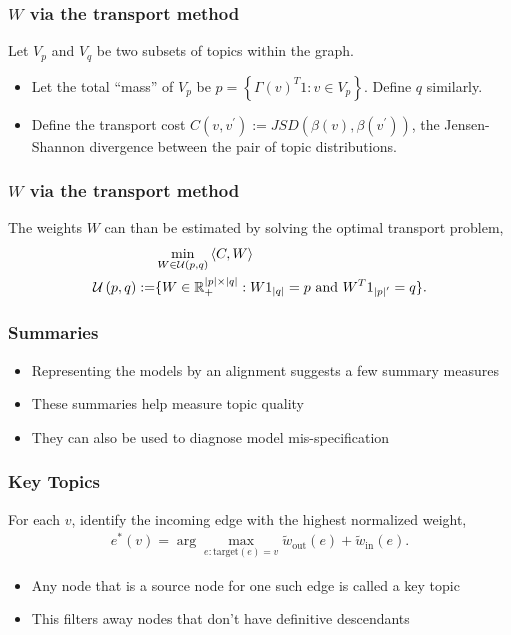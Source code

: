 \documentclass{beamer}
\begin{document}
\begin{frame}
  \frametitle{$W$ via the transport method}
  Let $V_p$ and $V_q$ be two subsets of topics within the graph.
  \begin{itemize}
    \item Let the total ``mass'' of $V_p$ be $p =
    \left\{\Gamma\left(v\right)^T 1 : v \in V_{p}\right\}$. Define $q$ similarly.
    \item Define the transport cost $C\left(v, v^\prime\right) :=
    JSD\left(\beta\left(v\right), \beta\left(v^\prime\right)\right)$, the
    Jensen-Shannon divergence between the pair of topic distributions.
  \end{itemize}
\end{frame}

\begin{frame}
\frametitle{$W$ via the transport method}
The weights $W$ can than be estimated by solving the optimal transport problem,
\begin{align*}
&\min_{W \in \mathcal{U}\left(p, q\right)} \left<C,W\right> \\
\mathcal{U}\left(p, q\right) := &\{W\in \mathbb{R}^{\left|p\right| \times \left|q\right|}_{+} : W 1_{\left|q\right|} = p \text{ and } W^{T} 1_{\left|p\right|^\prime} = q\}.
\end{align*}
\end{frame}

\begin{frame}
  \frametitle{Summaries}
  \begin{itemize}
    \item Representing the models by an alignment suggests a few summary measures
    \item These summaries help measure topic quality
    \item They can also be used to diagnose model mis-specification
  \end{itemize}
\end{frame}

\begin{frame}
  \frametitle{Key Topics}
  For each $v$, identify the incoming edge with the highest normalized weight,
  \begin{align*}
    e^\ast\left(v\right) = \arg \max_{e : \text{target}\left(e\right) = v} \tilde{w}_{\text{out}}\left(e\right) + \tilde{w}_{\text{in}}\left(e\right).
  \end{align*}
  \begin{itemize}
    \item Any node that is a source node for one such edge is called a key topic
    \item This filters away nodes that don't have definitive descendants
  \end{itemize}
\end{frame}
\end{document}
